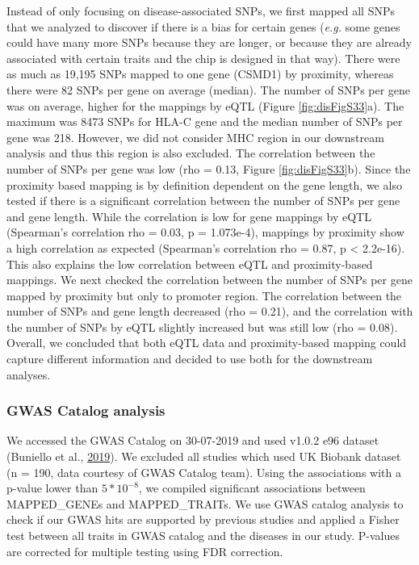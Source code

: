 \documentclass[12pt,twoside]{unicam}
\begin{document}
Instead of only focusing on disease-associated SNPs, we first mapped all SNPs that we analyzed to discover if there is a bias for certain genes (\emph{e.g.} some genes could have many more SNPs because they are longer, or because they are already associated with certain traits and the chip is designed in that way). There were as much as 19,195 SNPs mapped to one gene (CSMD1) by proximity, whereas there were 82 SNPs per gene on average (median). The number of SNPs per gene was on average, higher for the mappings by eQTL (Figure \ref{fig:disFigS33}a). The maximum was 8473 SNPs for HLA-C gene and the median number of SNPs per gene was 218. However, we did not consider MHC region in our downstream analysis and thus this region is also excluded. The correlation between the number of SNPs per gene was low (rho = 0.13, Figure \ref{fig:disFigS33}b). Since the proximity based mapping is by definition dependent on the gene length, we also tested if there is a significant correlation between the number of SNPs per gene and gene length. While the correlation is low for gene mappings by eQTL (Spearman's correlation rho = 0.03, p = 1.073e-4), mappings by proximity show a high correlation as expected (Spearman's correlation rho = 0.87, p \textless{} 2.2e-16). This also explains the low correlation between eQTL and proximity-based mappings. We next checked the correlation between the number of SNPs per gene mapped by proximity but only to promoter region. The correlation between the number of SNPs and gene length decreased (rho = 0.21), and the correlation with the number of SNPs by eQTL slightly increased but was still low (rho = 0.08). Overall, we concluded that both eQTL data and proximity-based mapping could capture different information and decided to use both for the downstream analyses.

\hypertarget{gwas-catalog-analysis}{%
\subsubsection{GWAS Catalog analysis}\label{gwas-catalog-analysis}}

We accessed the GWAS Catalog on 30-07-2019 and used v1.0.2 e96 dataset (Buniello et al., \protect\hyperlink{ref-Buniello2019}{2019}). We excluded all studies which used UK Biobank dataset (n = 190, data courtesy of GWAS Catalog team). Using the associations with a p-value lower than \(5*10^{-8}\), we compiled significant associations between MAPPED\_GENEs and MAPPED\_TRAITs. We use GWAS catalog analysis to check if our GWAS hits are supported by previous studies and applied a Fisher test between all traits in GWAS catalog and the diseases in our study. P-values are corrected for multiple testing using FDR correction.
\end{document}
